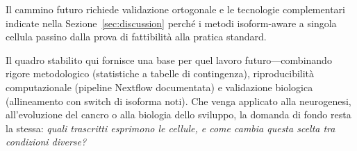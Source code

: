 Il cammino futuro richiede validazione ortogonale e le tecnologie complementari indicate nella Sezione~\ref{sec:discussion} perché i metodi isoform-aware a singola cellula passino dalla prova di fattibilità alla pratica standard.

Il quadro stabilito qui fornisce una base per quel lavoro futuro---combinando rigore metodologico (statistiche a tabelle di contingenza), riproducibilità computazionale (pipeline Nextflow documentata) e validazione biologica (allineamento con switch di isoforma noti). Che venga applicato alla neurogenesi, all'evoluzione del cancro o alla biologia dello sviluppo, la domanda di fondo resta la stessa: \textit{quali trascritti esprimono le cellule, e come cambia questa scelta tra condizioni diverse?}
